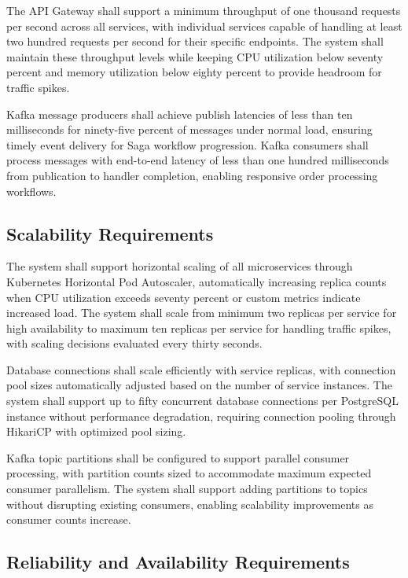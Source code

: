 The API Gateway shall support a minimum throughput of one thousand requests per second across all services, with individual services capable of handling at least two hundred requests per second for their specific endpoints. The system shall maintain these throughput levels while keeping CPU utilization below seventy percent and memory utilization below eighty percent to provide headroom for traffic spikes.

Kafka message producers shall achieve publish latencies of less than ten milliseconds for ninety-five percent of messages under normal load, ensuring timely event delivery for Saga workflow progression. Kafka consumers shall process messages with end-to-end latency of less than one hundred milliseconds from publication to handler completion, enabling responsive order processing workflows.

\subsection{Scalability Requirements}

The system shall support horizontal scaling of all microservices through Kubernetes Horizontal Pod Autoscaler, automatically increasing replica counts when CPU utilization exceeds seventy percent or custom metrics indicate increased load. The system shall scale from minimum two replicas per service for high availability to maximum ten replicas per service for handling traffic spikes, with scaling decisions evaluated every thirty seconds.

Database connections shall scale efficiently with service replicas, with connection pool sizes automatically adjusted based on the number of service instances. The system shall support up to fifty concurrent database connections per PostgreSQL instance without performance degradation, requiring connection pooling through HikariCP with optimized pool sizing.

Kafka topic partitions shall be configured to support parallel consumer processing, with partition counts sized to accommodate maximum expected consumer parallelism. The system shall support adding partitions to topics without disrupting existing consumers, enabling scalability improvements as consumer counts increase.

\subsection{Reliability and Availability Requirements}

